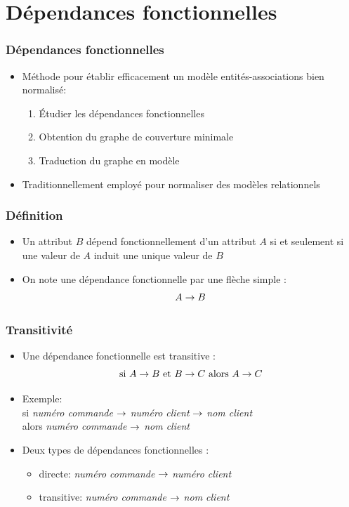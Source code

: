 \section{Dépendances fonctionnelles}

\begin{frame}
  \frametitle{Dépendances fonctionnelles}
  \begin{itemize}
    \item Méthode pour établir efficacement un modèle entités-associations bien normalisé:
      \begin{enumerate}
        \item Étudier les dépendances fonctionnelles
        \item Obtention du graphe de couverture minimale
        \item Traduction du graphe en modèle
      \end{enumerate}
    \item Traditionnellement employé pour normaliser des modèles relationnels
  \end{itemize}
\end{frame}

\begin{frame}
  \frametitle{Définition}
  \begin{itemize}
    \item Un attribut $B$ dépend fonctionnellement d'un attribut $A$ si et seulement si une valeur de $A$ induit une
      unique valeur de $B$
    \item On note une dépendance fonctionnelle par une flèche simple : $$A \rightarrow B$$
  \end{itemize}
\end{frame}

\begin{frame}
  \frametitle{Transitivité}
  \begin{itemize}
    \item Une dépendance fonctionnelle est transitive : $$\text{si } A \rightarrow B \text{ et } B \rightarrow C \text{ alors } A \rightarrow C$$
    \item Exemple:\\
      si \emph{numéro commande} $\rightarrow$ \emph{numéro client} $\rightarrow$ \emph{nom client}\\
      alors \emph{numéro commande} $\rightarrow$ \emph{nom client}
    \item Deux types de dépendances fonctionnelles :
      \begin{itemize}
        \item directe: \emph{numéro commande} $\rightarrow$ \emph{numéro client}
        \item transitive: \emph{numéro commande} $\rightarrow$ \emph{nom client}
      \end{itemize}
  \end{itemize}
\end{frame}

